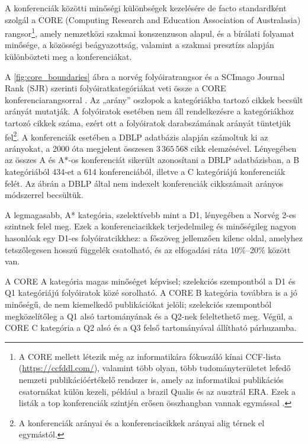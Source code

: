 \documentclass[12pt,a4paper]{article}
\begin{document}
A konferenciák közötti minőségi különbségek kezelésére de facto standardként szolgál a CORE (Computing Research and Education Association of Australasia) rangsor\footnote{A CORE mellett létezik még az informatikára fókuszáló kínai CCF-lista (\url{https://ccfddl.com/}), valamint több olyan, több tudományterületet lefedő nemzeti publikációértékelő rendszer is, amely az informatikai publikációs csatornákat külön kezeli, például a brazil Qualis és az ausztrál ERA. Ezek a listák a top konferenciák szintjén erősen összhangban vannak egymással \cite{li2018impact}.}, amely nemzetközi szakmai konszenzuson alapul, és a bírálati folyamat minősége, a közösségi beágyazottság, valamint a szakmai presztízs alapján különbözteti meg a konferenciákat. 



A \ref{fig:core_boundaries} ábra a norvég folyóiratrangsor \cite{NorwegianRegister2025} és a SCImago Journal Rank (SJR) szerinti folyóiratkategóriákat veti össze a CORE konferenciarangsorral \cite{coreweb}. Az „arány” oszlopok a kategóriákba tartozó cikkek becsült arányát mutatják. A folyóiratok esetében nem áll rendelkezésre a kategóriákhoz tartozó cikkek száma, ezért ott a folyóiratok darabszámának arányát tüntetjük fel\footnote{A konferenciák arányai és a konferenciacikkek arányai alig térnek el egymástól.}.
A konferenciák esetében a DBLP adatbázis alapján számoltuk ki az arányokat, a 2000 óta megjelent összesen $3\,365\,568$ cikk elemzésével. Lényegében az összes A és A\!*-os konferenciát sikerült azonosítani a DBLP adatbázisban, a B kategóriából 434-et a 614 konferenciából, illetve a C kategóriájú konferenciák felét. Az ábrán a DBLP által nem indexelt konferenciák cikkszámait arányos módszerrel becsültük.

A legmagasabb, A\!* kategória, szelektívebb mint a D1, lényegében a Norvég 2-es szintnek felel meg. Ezek a konferenciacikkek  terjedelmileg és minőségileg nagyon hasonlóak egy D1-es folyóiratcikkhez: a főszöveg jellemzően kilenc oldal, amelyhez tetszőlegesen hosszú függelék csatolható, és az elfogadási ráta 10\%–20\% között van. 

A CORE A kategória magas minőséget képvisel; szelekciós szempontból a D1 és Q1 kategóriájú folyóiratok közé sorolható. A CORE B kategória továbbra is a jó minőségű, de nem kiemelkedő publikációkat jelöli; szelekciós szempontból megközelítőleg a Q1 alsó tartományának és a Q2-nek feleltethető meg. Végül, a CORE C kategória a Q2 alsó és a Q3 felső tartományával állítható párhuzamba. 
\end{document}
